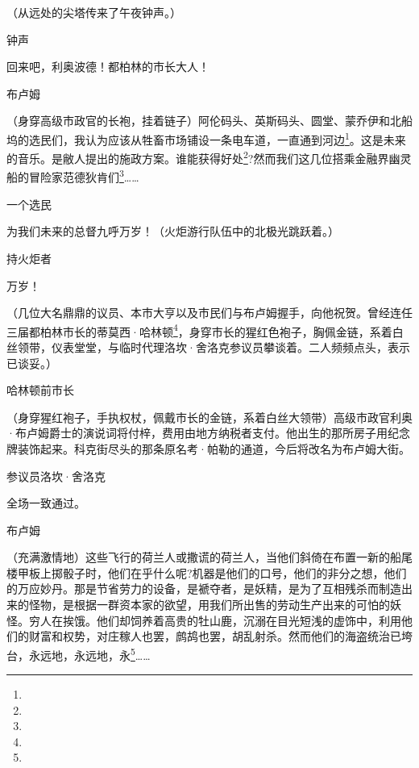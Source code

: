 \par （从远处的尖塔传来了午夜钟声。）
\par 钟声
\par 回来吧，利奥波德！都柏林的市长大人！
\par 布卢姆
\par （身穿高级市政官的长袍，挂着链子）阿伦码头、英斯码头、圆堂、蒙乔伊和北船坞的选民们，我认为应该从牲畜市场铺设一条电车道，一直通到河边\footnote{}。这是未来的音乐。是敝人提出的施政方案。谁能获得好处\footnote{}?然而我们这几位搭乘金融界幽灵船的冒险家范德狄肯们\footnote{}……
\par 一个选民
\par 为我们未来的总督九呼万岁！（火炬游行队伍中的北极光跳跃着。）
\par 持火炬者
\par 万岁！
\par （几位大名鼎鼎的议员、本市大亨以及市民们与布卢姆握手，向他祝贺。曾经连任三届都柏林市长的蒂莫西·哈林顿\footnote{}，身穿市长的猩红色袍子，胸佩金链，系着白丝领带，仪表堂堂，与临时代理洛坎·舍洛克参议员攀谈着。二人频频点头，表示已谈妥。）
\par 哈林顿前市长
\par （身穿猩红袍子，手执权杖，佩戴市长的金链，系着白丝大领带）高级市政官利奥·布卢姆爵士的演说词将付梓，费用由地方纳税者支付。他出生的那所房子用纪念牌装饰起来。科克街尽头的那条原名考·帕勒的通道，今后将改名为布卢姆大街。
\par 参议员洛坎·舍洛克
\par 全场一致通过。
\par 布卢姆
\par （充满激情地）这些飞行的荷兰人或撒谎的荷兰人，当他们斜倚在布置一新的船尾楼甲板上掷骰子时，他们在乎什么呢?机器是他们的口号，他们的非分之想，他们的万应妙丹。那是节省劳力的设备，是褫夺者，是妖精，是为了互相残杀而制造出来的怪物，是根据一群资本家的欲望，用我们所出售的劳动生产出来的可怕的妖怪。穷人在挨饿。他们却饲养着高贵的牡山鹿，沉溺在目光短浅的虚饰中，利用他们的财富和权势，对庄稼人也罢，鹧鸪也罢，胡乱射杀。然而他们的海盗统治已垮台，永远地，永远地，永\footnote{}……
